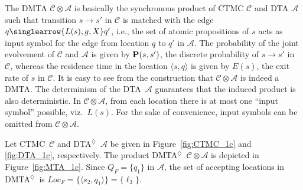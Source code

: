 \documentclass{LMCS}
\newcommand{\mc}[1]{\mathcal{#1}}
\newcommand{\<}{\langle}
\renewcommand{\>}{\rangle}
\newcommand{\CTMC}{\textsc{{CTMC}}}
\newcommand{\DTA}{\textsc{DTA}}
\newcommand{\DTAr}{\DTA$^{\!\Ever}$}
\newcommand{\DMTAr}{\DMTA$^{\!\Ever}$}
\newcommand{\DMTA}{\textsc{DMTA}}
\newcommand{\mv}[1]{\singlearrow{#1}}
\renewcommand{\P}{{\bf P}}
\newcommand{\F}{\mathop{\diamondsuit}}
\newcommand{\Ever}{\F}
\begin{document}
The DMTA $\mc{C} \otimes \mc{A}$ is basically the synchronous product of CTMC
$\mc{C}$ and DTA $\mc{A}$ such that transition $s \to s'$ in $\mc{C}$ is matched
with the edge $q \mv{L(s), g, X} q'$, i.e., the set of atomic propositions of $s$ acts
as input symbol for the edge from location $q$ to $q'$ in $\mc{A}$.
The probability of the joint evolvement of $\mc{C}$ and $\mc{A}$ is given by $\P(s,s')$,
the discrete probability of $s \to s'$ in $\mc{C}$, whereas the residence time in the
location $\< s, q \>$ is given by $E(s)$, the exit rate of $s$ in $\mc{C}$.
It is easy to see from the construction that $\mc{C}\otimes\mc{A}$ is indeed a \DMTA.
The determinism of the \DTA\ $\mc{A}$ guarantees that the induced product is also
deterministic.
In $\mc{C} \otimes \mc{A}$, from each location there is at most one ``input symbol''
possible, viz.\ $L(s)$.
For the sake of convenience, input symbols can be omitted from $\mc{C} \otimes \mc{A}$.

\begin{exa}\label{ex:product_DMTAr}
Let \CTMC\ $\mc{C}$ and \DTAr\ $\mc{A}$ be given in Figure~\ref{fig:CTMC_1c}
and \ref{fig:DTA_1c}, respectively.
The product \DMTAr\ $\mc{C}{\otimes}\mc{A}$ is depicted in Figure~\ref{fig:MTA_1c}.
Since $Q_F=\{q_1\}$ in $\mc{A}$, the set of accepting locations in
\DMTAr\ is $Loc_F=\{\<s_2,q_1\>\}=\{\ell_3\}$.
\end{exa}
\end{document}
